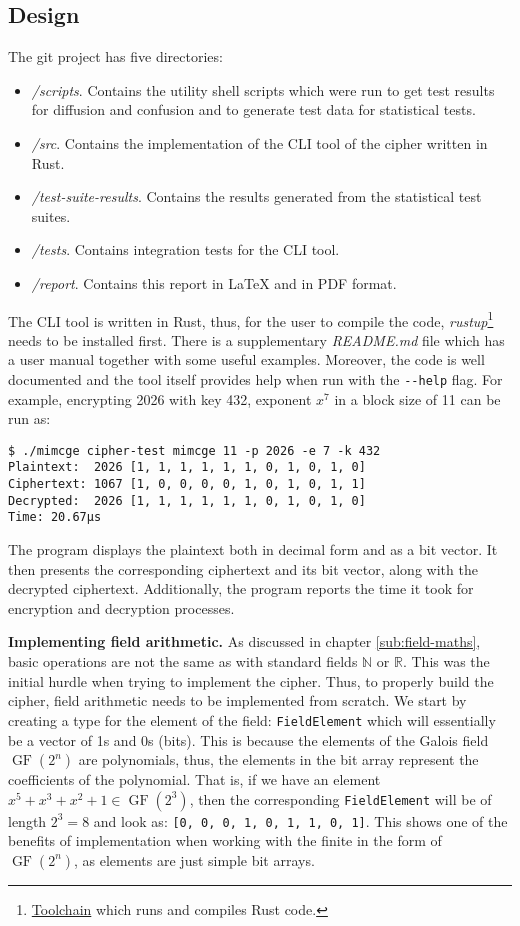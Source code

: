 \documentclass{Resources/UoBLab1}
\theoremstyle{definition}
\begin{document}
\subsection{Design}\label{sub:finite-field-impl}
The git project has five directories:
\begin{itemize}
    \item \textit{/scripts}. Contains the utility shell scripts which were run to get test results for diffusion and confusion and to generate test data for statistical tests.
    \item \textit{/src}. Contains the implementation of the CLI tool of the cipher written in Rust.
    \item \textit{/test-suite-results}. Contains the results generated from the statistical test suites.
    \item \textit{/tests}. Contains integration tests for the CLI tool.
    \item \textit{/report}. Contains this report in \LaTeX{} and in PDF format.
\end{itemize}
The CLI tool is written in Rust, thus, for the user to compile the code, \textit{rustup}\footnote{\href{https://www.rust-lang.org/tools/install}{Toolchain} which runs and compiles Rust code.} needs to be installed first. There is a supplementary \textit{README.md} file which has a user manual together with some useful examples. Moreover, the code is well documented and the tool itself provides help when run with the \verb|--help| flag. For example, encrypting 2026 with key 432, exponent $x^7$ in a block size of 11 can be run as:
\begin{verbatim}
$ ./mimcge cipher-test mimcge 11 -p 2026 -e 7 -k 432
Plaintext:  2026 [1, 1, 1, 1, 1, 1, 0, 1, 0, 1, 0]
Ciphertext: 1067 [1, 0, 0, 0, 0, 1, 0, 1, 0, 1, 1]
Decrypted:  2026 [1, 1, 1, 1, 1, 1, 0, 1, 0, 1, 0]
Time: 20.67µs
\end{verbatim}
The program displays the plaintext both in decimal form and as a bit vector. It then presents the corresponding ciphertext and its bit vector, along with the decrypted ciphertext. Additionally, the program reports the time it took for encryption and decryption processes.\medskip

\noindent\textbf{Implementing field arithmetic.} As discussed in chapter \ref{sub:field-maths}, basic operations are not the same as with standard fields $\mathbb{N}$ or $\mathbb{R}$. This was the initial hurdle when trying to implement the cipher. Thus, to properly build the cipher, field arithmetic needs to be implemented from scratch. We start by creating a type for the element of the field: \verb|FieldElement| which will essentially be a vector of 1s and 0s (bits). This is because the elements of the Galois field $\operatorname{GF}(2^n)$ are polynomials, thus, the elements in the bit array represent the coefficients of the polynomial. That is, if we have an element $x^5+x^3+x^2+1 \in \operatorname{GF}(2^3)$, then the corresponding \verb|FieldElement| will be of length $2^3 = 8$ and look as: \verb|[0, 0, 0, 1, 0, 1, 1, 0, 1]|. This shows one of the benefits of implementation when working with the finite in the form of $\operatorname{GF}(2^n)$, as elements are just simple bit arrays.
\end{document}

